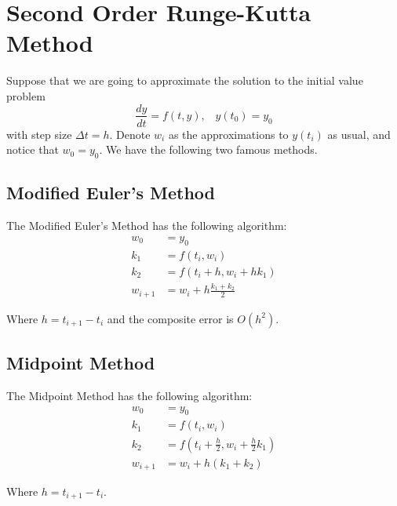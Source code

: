 \section{Second Order Runge-Kutta Method}
Suppose that we are going to approximate the solution to the initial value problem
\[  \frac{dy}{dt} = f(t,y),\;\;\;y(t_0) = y_0 \] 
with step size $\Delta t = h$. Denote $w_i$ as the approximations to $y(t_i)$ as usual, and notice that $w_0 = y_0$. We have the following two famous methods.

\subsection*{Modified Euler's Method}
\begin{thm}
	The Modified Euler's Method has the following algorithm:
	\begin{align*}
	w_0 &= y_0\\
	k_1 &= f(t_i, w_i)\\
	k_2 &= f(t_i + h, w_i + hk_1)\\
	w_{i+1} &= w_i + h\frac{k_1+k_2}{2}
	\end{align*}
	
	Where $h = t_{i+1}-t_i$ and the composite error is $O(h^2)$.
\end{thm}

\subsection*{Midpoint Method}
\begin{thm}
	The Midpoint Method has the following algorithm:
	\begin{align*}
	w_0 &= y_0\\
	k_1 &= f(t_i, w_i)\\
	k_2 &= f\left(t_i + \frac{h}{2}, w_i + \frac{h}{2}k_1\right)\\
	w_{i+1} &= w_i + h(k_1+k_2)
	\end{align*}
	
	Where $h = t_{i+1}-t_i$.
\end{thm}

